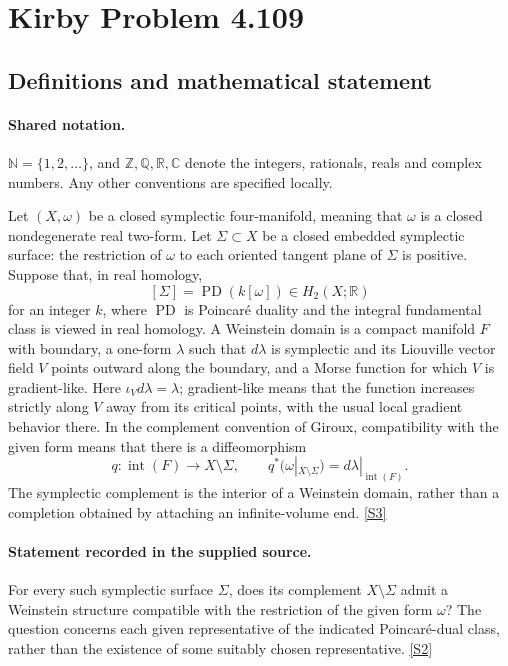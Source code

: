 \documentclass[11pt]{article}
\newcommand{\sref}[2]{\hyperlink{source:#1:#2}{[S#2]}}
\begin{document}
\section{Kirby Problem 4.109}\label{statement}

\subsection{Definitions and mathematical statement}

\paragraph{Shared notation.}$\mathbb N=\{1,2,\ldots\}$, and $\mathbb Z,\mathbb Q,\mathbb R,\mathbb C$ denote the integers, rationals, reals and complex numbers. Any other conventions are specified locally.


Let $(X,\omega)$ be a closed symplectic four-manifold, meaning that $\omega$ is a closed nondegenerate real two-form. Let $\Sigma\subset X$ be a closed embedded symplectic surface: the restriction of $\omega$ to each oriented tangent plane of $\Sigma$ is positive. Suppose that, in real homology,
\[
[\Sigma]=\operatorname{PD}(k[\omega])\in H_2(X;\mathbb R)
\]
for an integer $k$, where $\operatorname{PD}$ is Poincaré duality and the integral fundamental class is viewed in real homology. A Weinstein domain is a compact manifold $F$ with boundary, a one-form $\lambda$ such that $d\lambda$ is symplectic and its Liouville vector field $V$ points outward along the boundary, and a Morse function for which $V$ is gradient-like. Here $\iota_Vd\lambda=\lambda$; gradient-like means that the function increases strictly along $V$ away from its critical points, with the usual local gradient behavior there. In the complement convention of Giroux, compatibility with the given form means that there is a diffeomorphism
\[
 q:\operatorname{int}(F)\longrightarrow X\setminus\Sigma,
 \qquad q^*(\omega|_{X\setminus\Sigma})=d\lambda|_{\operatorname{int}(F)}.
\]
The symplectic complement is the interior of a Weinstein domain, rather than a completion obtained by attaching an infinite-volume end. \sref{statement}{3}
\paragraph{Statement recorded in the supplied source.}
For every such symplectic surface $\Sigma$, does its complement $X\setminus\Sigma$ admit a Weinstein structure compatible with the restriction of the given form $\omega$? The question concerns each given representative of the indicated Poincaré-dual class, rather than the existence of some suitably chosen representative. \sref{statement}{2}
\end{document}
